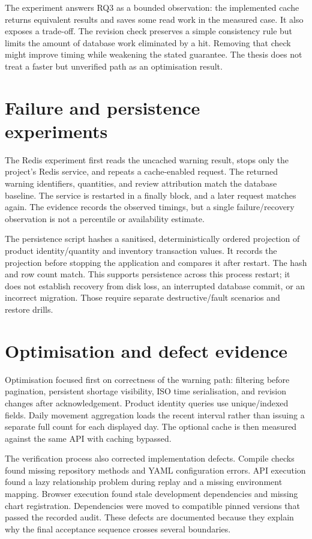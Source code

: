 The experiment answers RQ3 as a bounded observation: the implemented cache returns equivalent results and saves some read work in the measured case. It also exposes a trade-off. The revision check preserves a simple consistency rule but limits the amount of database work eliminated by a hit. Removing that check might improve timing while weakening the stated guarantee. The thesis does not treat a faster but unverified path as an optimisation result.

\section{Failure and persistence experiments}
The Redis experiment first reads the uncached warning result, stops only the project's Redis service, and repeats a cache-enabled request. The returned warning identifiers, quantities, and review attribution match the database baseline. The service is restarted in a finally block, and a later request matches again. The evidence records the observed timings, but a single failure/recovery observation is not a percentile or availability estimate.

The persistence script hashes a sanitised, deterministically ordered projection of product identity/quantity and inventory transaction values. It records the projection before stopping the application and compares it after restart. The hash and row count match. This supports persistence across this process restart; it does not establish recovery from disk loss, an interrupted database commit, or an incorrect migration. Those require separate destructive/fault scenarios and restore drills.

\section{Optimisation and defect evidence}
Optimisation focused first on correctness of the warning path: filtering before pagination, persistent shortage visibility, ISO time serialisation, and revision changes after acknowledgement. Product identity queries use unique/indexed fields. Daily movement aggregation loads the recent interval rather than issuing a separate full count for each displayed day. The optional cache is then measured against the same API with caching bypassed.

The verification process also corrected implementation defects. Compile checks found missing repository methods and YAML configuration errors. API execution found a lazy relationship problem during replay and a missing environment mapping. Browser execution found stale development dependencies and missing chart registration. Dependencies were moved to compatible pinned versions that passed the recorded audit. These defects are documented because they explain why the final acceptance sequence crosses several boundaries.

